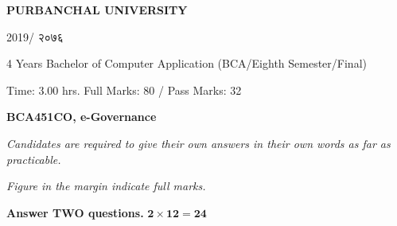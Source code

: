 \documentclass[a4paper, twoside, 12pt, noanswers]{exam}
\newcommand{\textnp}{\texthindi}
\begin{document}

\begin{framed}
	\raggedright{\bfseries\Large\centering PURBANCHAL UNIVERSITY \par {2019/ \textnp{२०७६}}\par}
	{ 4 Years Bachelor of Computer Application (BCA/Eighth Semester/Final)\par}
	{ Time: 3.00 hrs.  \hfill Full Marks: 80 / Pass Marks: 32\par}
	{\bfseries {BCA451CO, e-Governance \hfill}\par}
\end{framed}
{\noindent \it{Candidates are required to give their own answers in their own words as far as practicable.  }\par}
{\noindent \it{Figure in the margin indicate full marks.}\par}

{}
{\hspace*{-0.5cm} \bfseries Answer TWO questions.} \hfill {\( \mathbf{2\times 12 =24}\)}
\end{document}
